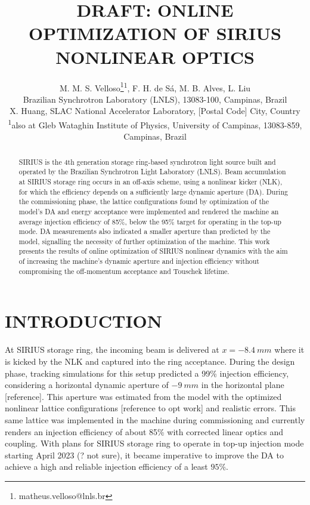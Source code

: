 \documentclass[a4paper,
               keeplastbox,   %
               ]{jacow}
\begin{document}
\title{DRAFT: ONLINE OPTIMIZATION OF SIRIUS NONLINEAR OPTICS}

\author{M. M. S. Velloso\thanks{matheus.velloso@lnls.br}\textsuperscript{1}, F. H. de Sá, M. B. Alves, L. Liu\\ Brazilian Synchrotron Laboratory (LNLS), 13083-100, Campinas, Brazil \\
		X. Huang, SLAC National Accelerator Laboratory, [Postal Code] City, Country \\
		\textsuperscript{1}also at Gleb Wataghin Institute of Physics, University of Campinas, 13083-859, Campinas, Brazil 
}
	
\maketitle
%
\begin{abstract}
SIRIUS is the 4th generation storage ring-based synchrotron light source built and operated by the Brazilian Synchrotron Light Laboratory (LNLS). Beam accumulation at SIRIUS storage ring occurs in an off-axis scheme, using a nonlinear kicker (NLK), for which the efficiency depends on a sufficiently large dynamic aperture (DA). During the commissioning phase, the lattice configurations found by optimization of the model's DA and energy acceptance were implemented and rendered the machine an average injection efficiency of 85\%,  below the 95\% target for operating in the top-up mode. DA measurements also indicated a smaller aperture than predicted by the model, signalling the necessity of further optimization of the machine. This work presents the results of online optimization of SIRIUS nonlinear dynamics with the aim of increasing the machine's dynamic aperture and injection efficiency without compromising the off-momentum acceptance and Touschek lifetime. 
\end{abstract}


\section{INTRODUCTION}
At SIRIUS storage ring, the incoming beam is delivered at $x=-8.4~\unit{mm}$ where it is kicked by the NLK and captured into the ring acceptance. During the design phase, tracking simulations for this setup predicted a 99\% injection efficiency, considering a horizontal dynamic aperture of $-9~\unit{mm}$ in the horizontal plane [reference]. This aperture was estimated from the model with the optimized nonlinear lattice configurations [reference to opt work] and realistic errors. This same lattice was implemented in the machine during commissioning and currently renders an injection efficiency of about 85\% with corrected linear optics and coupling. With plans for SIRIUS storage ring to operate in top-up injection mode starting April 2023 (? not sure), it became imperative to improve the DA to achieve a high and reliable injection efficiency of a least $95\%$. 
\end{document}
